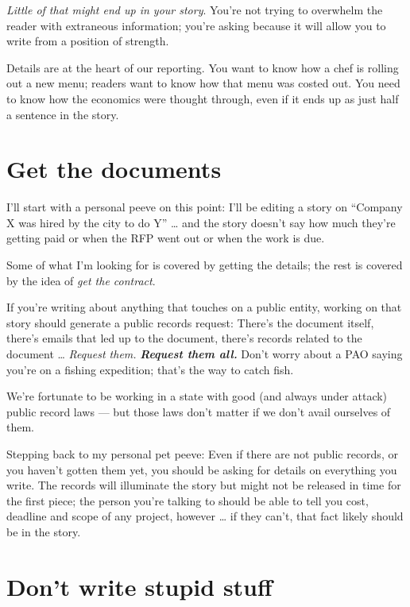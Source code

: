 \documentclass[
  11pt,
  american,
  letterpaperpaper,
  extrafontsizes,onecolumn,openright
  ]{memoir}
\begin{document}
\emph{Little of that might end up in your story}. You're not trying to overwhelm the reader with extraneous information; you're asking because it will allow you to write from a position of strength.

Details are at the heart of our reporting. You want to know how a chef is rolling out a new menu; readers want to know how that menu was costed out. You need to know how the economics were thought through, even if it ends up as just half a sentence in the story.

\hypertarget{get-the-documents}{%
\section*{Get the documents}\label{get-the-documents}}

I'll start with a personal peeve on this point: I'll be editing a story on \enquote{Company X was hired by the city to do Y} \ldots{} and the story doesn't say how much they're getting paid or when the RFP went out or when the work is due.

Some of what I'm looking for is covered by getting the details; the rest is covered by the idea of \emph{get the contract}.

If you're writing about anything that touches on a public entity, working on that story should generate a public records request: There's the document itself, there's emails that led up to the document, there's records related to the document \ldots{} \emph{Request them.} \textbf{\emph{Request them all.}} Don't worry about a PAO saying you're on a fishing expedition; that's the way to catch fish.

We're fortunate to be working in a state with good (and always under attack) public record laws --- but those laws don't matter if we don't avail ourselves of them.

Stepping back to my personal pet peeve: Even if there are not public records, or you haven't gotten them yet, you should be asking for details on everything you write. The records will illuminate the story but might not be released in time for the first piece; the person you're talking to should be able to tell you cost, deadline and scope of any project, however \ldots{} if they can't, that fact likely should be in the story.

\hypertarget{dont-write-stupid-stuff}{%
\section*{Don't write stupid stuff}\label{dont-write-stupid-stuff}}
\end{document}
